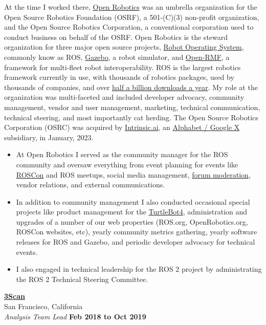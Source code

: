 \documentclass[10pt]{article}
\newenvironment{outerlist}[1][\enskip\textbullet]%
        {\begin{itemize}[#1]}{\end{itemize}%
         \vspace{-.6\baselineskip}}
\newcommand{\blankline}{\quad\pagebreak[2]}
\begin{document}
At the time I worked there, \href{http://www.openrobotics.org}{Open Robotics} was an umbrella organization for the Open Source Robotics Foundation (OSRF), a 501-(C)(3) non-profit organization, and the Open Source Robotics Corporation, a conventional corporation used to conduct business on behalf of the OSRF. Open Robotics is the steward organization for three major open source projects, \href{https://ros.org/}{Robot Operating System}, commonly know as ROS, \href{https://gazebosim.org/home}{Gazebo}, a robot simulator, and \href{https://www.open-rmf.org/}{Open-RMF}, a framework for multi-fleet robot interoperability. ROS is the largest robotics framework currently in use, with thousands of robotics  packages, used by thousands of companies, and over \href{http://download.ros.org/downloads/metrics/metrics-report-2022-07.pdf}{half a billion downloads a year}. My role at the organization was multi-faceted and included developer advocacy, community management, vendor and user management, marketing, technical communication, technical steering, and most importantly cat herding. The Open Source Robotics Corporation (OSRC) was acquired by \href{https://intrinsic.ai/}{Intrinsic.ai}, an \href{https://x.company/}{Alphabet / Google X} subsidiary, in January, 2023.   
\begin{outerlist}
\item At Open Robotics I served as the community manager for the ROS community and oversaw everything from event planning for events like \href{https://roscon.ros.org/2023/}{ROSCon} and ROS meetups, social media management, \href{https://discourse.ros.org/}{forum moderation}, vendor relations, and external communications. 
\item In addition to community management I also conducted occasional special projects like product management for the \href{https://turtlebot.github.io/turtlebot4-user-manual/}{TurtleBot4}, administration and upgrades of a number of our web properties (ROS.org, OpenRobotics.org, ROSCon websites, etc), yearly community metrics gathering, yearly software releases for ROS and Gazebo, and periodic developer advocacy for technical events.
\item I also engaged in technical leadership for the ROS 2 project by administrating the ROS 2 Technical Steering Committee.  
\end{outerlist}
\blankline
\newline
\href{http://www.3Scan.com/}{\textbf{3Scan}} \\
San Francisco, California \\
\textit{Analysis Team Lead}%
        \hfill \textbf{Feb 2018 to Oct 2019}  \\
\end{document}
